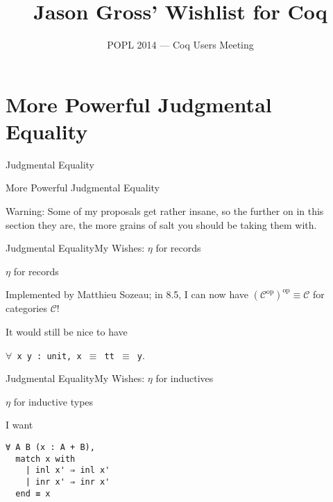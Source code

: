 \documentclass{beamer}
\title{Jason Gross' Wishlist for Coq}
\date{POPL 2014 --- Coq Users Meeting}
\begin{document}
\begin{frame}
\maketitle
\end{frame}

\begin{frame}
\tableofcontents
\end{frame}


\section{More Powerful Judgmental Equality}

\begin{frame}{Judgmental Equality}
  \Large
  \begin{center}
    More Powerful Judgmental Equality
  \end{center} \pause
  
  Warning: Some of my proposals get rather insane, so the further on in this section they are, the more grains of salt you should be taking them with.
\end{frame}

\begin{frame}{Judgmental Equality}{My Wishes: \texorpdfstring{$\eta$}{η} for records}
  \Large
  \begin{center}
    $\eta$ for records
  \end{center}
  
  Implemented by Matthieu Sozeau; in 8.5, I can now have $(\mathcal C^{\text{op}})^\text{op} \equiv \mathcal C$ for categories $\mathcal C$! \pause
  
  It would still be nice to have
  \begin{center}
  \texttt{$\forall$ x y :\ unit, x $\equiv$ tt $\equiv$ y}.
  \end{center}
\end{frame}

\begin{frame}[fragile]{Judgmental Equality}{My Wishes: \texorpdfstring{$\eta$}{η} for inductives}
  \Large
  \begin{center}
    $\eta$ for inductive types
  \end{center}
  I want
\begin{verbatim}
∀ A B (x : A + B),
  match x with
    | inl x' ⇒ inl x'
    | inr x' ⇒ inr x'
  end ≡ x
\end{verbatim}
\end{frame}
\end{document}
